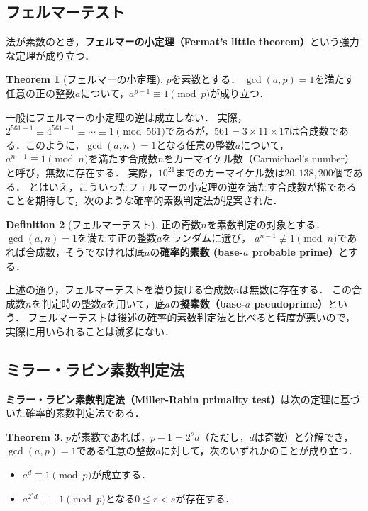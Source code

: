 \documentclass[uplatex]{jsarticle}
\theoremstyle{definition}
\newtheorem{dfn}{Definition}[section]
\newtheorem{thm}[dfn]{Theorem}
\begin{document}
\subsection{フェルマーテスト}

法が素数のとき，\textbf{フェルマーの小定理（Fermat's little theorem）}という強力な定理が成り立つ．

\begin{thm}[フェルマーの小定理]
    $p$を素数とする．
    $\gcd(a,p)=1$を満たす任意の正の整数$a$について，$a^{p-1} \equiv 1 \pmod{p}$が成り立つ．
\end{thm}

一般にフェルマーの小定理の逆は成立しない．
実際，$2^{561-1} \equiv 4^{561-1} \equiv \cdots \equiv 1 \pmod{561}$であるが，$561=3 \times 11 \times 17$は合成数である．このように，$\gcd(a,n)=1$となる任意の整数$a$について，$a^{n-1}\equiv1\pmod{n}$を満たす合成数$n$をカーマイケル数（Carmichael's number）と呼び，無数に存在する．
実際，$10^{21}$までのカーマイケル数は$20{,}138{,}200$個である\cite{pinch2007carmichael}．
とはいえ，こういったフェルマーの小定理の逆を満たす合成数が稀であることを期待して，次のような確率的素数判定法が提案された．

\begin{dfn}[フェルマーテスト]
    正の奇数$n$を素数判定の対象とする．
    $\gcd(a,n)=1$を満たす正の整数$a$をランダムに選び，
    $a^{n-1}\not\equiv1\pmod{n}$であれば合成数，そうでなければ底$a$の\textbf{確率的素数 (base-$a$ probable prime）}とする．
\end{dfn}

上述の通り，フェルマーテストを潜り抜ける合成数$n$は無数に存在する．
この合成数$n$を判定時の整数$a$を用いて，底$a$の\textbf{擬素数（base-$a$ pseudoprime）}という．
フェルマーテストは後述の確率的素数判定法と比べると精度が悪いので，実際に用いられることは滅多にない．

\subsection{ミラー・ラビン素数判定法}

\textbf{ミラー・ラビン素数判定法（Miller-Rabin primality test）}は次の定理に基づいた確率的素数判定法である．

\begin{thm}
    $p$が素数であれば，$p-1=2^sd$（ただし，$d$は奇数）と分解でき，$\gcd(a,p)=1$である任意の整数$a$に対して，次のいずれかのことが成り立つ．
    \begin{itemize}
        \item $a^d \equiv 1 \pmod{p}$が成立する．
        \item $a^{2^rd} \equiv -1 \pmod{p}$となる$0 \leq r < s$が存在する．
    \end{itemize}
\end{thm}
\end{document}
